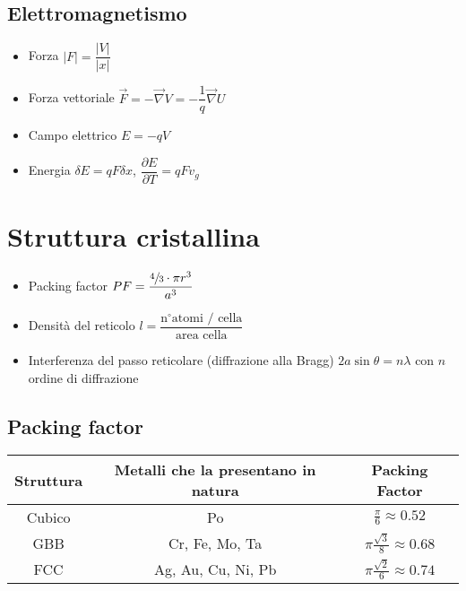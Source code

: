 \documentclass{article}
\begin{document}
\subsection{Elettromagnetismo}
\begin{itemize}
  \item Forza \( |F| = \dfrac{|V|}{|x|} \)
  \item Forza vettoriale \( \vec{F} = - \vec{\nabla} V = -\dfrac{1}{q} \vec{\nabla} U \)
  \item Campo elettrico \( E = -q V \)
  \item Energia \( \delta E = q F \delta x \), \( \dfrac{\partial E}{\partial T} = q F v_g  \)
\end{itemize}

\newpage

\section{Struttura cristallina}
\begin{itemize}
  \item Packing factor \( PF = \dfrac{ \sfrac{4}{3} \cdot \pi r^3}{a^3} \)
  \item Densità del reticolo \( l = \dfrac{\text{n} ^ \circ \text{atomi / cella}}{\text{area cella}} \)
  \item Interferenza del passo reticolare (diffrazione alla Bragg) \(  2a \sin \theta = n \lambda \) con \( n \) ordine di diffrazione
\end{itemize}

\subsection{Packing factor}
\vspace{1cm}
\renewcommand{\arraystretch}{2}
\begin{center}
  \begin{tabular}{|c|c|c|}
    \hline
    \textbf{Struttura} & \textbf{Metalli che la presentano in natura} & \textbf{Packing Factor}                  \\
    \hline
    Cubico             & Po                                           & \(\frac{\pi}{6} \approx 0.52 \)          \\
    \hline
    GBB                & Cr, Fe, Mo, Ta                               & \(\pi \frac{\sqrt{3}}{8} \approx 0.68 \) \\
    \hline
    FCC                & Ag, Au, Cu, Ni, Pb                           & \(\pi \frac{\sqrt{2}}{6} \approx 0.74 \) \\
    \hline
  \end{tabular}
\end{center}
\renewcommand{\arraystretch}{1}
\vspace{1cm}
\end{document}

